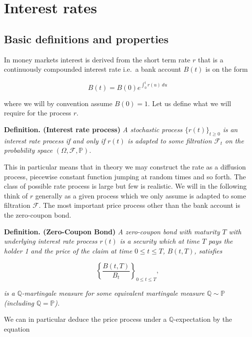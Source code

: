 \documentclass[a4paper,12pt,openany]{book}
\begin{document}
\hypertarget{interest-rates}{%
\section{Interest rates}\label{interest-rates}}

\hypertarget{basic-definitions-and-properties}{%
\subsection{Basic definitions and properties}\label{basic-definitions-and-properties}}

In money markets interest is derived from the short term rate \(r\) that is a continuously compounded interest rate i.e.~a bank account \(B(t)\) is on the form

\[
B(t)=B(0)e^{\int_0^tr(u)\ du}
\]

where we will by convention assume \(B(0)=1\). Let us define what we will require for the process \(r\).

\textbf{Definition. (Interest rate process)} \emph{A stochastic process \(\{r(t)\}_{t\ge 0}\) is an interest rate process if and only if \(r(t)\) is adapted to some filtration \(\mathcal F_t\) on the probability space \((\Omega,\mathcal F,\mathbb P)\).}

This in particular means that in theory we may construct the rate as a diffusion process, piecewise constant function jumping at random times and so forth. The class of possible rate process is large but few is realistic. We will in the following think of \(r\) generally as a given process which we only assume is adapted to some filtration \(\mathcal F\). The most important price process other than the bank account is the zero-coupon bond.

\textbf{Definition. (Zero-Coupon Bond)} \emph{A zero-coupon bond with maturity \(T\) with underlying interest rate process \(r(t)\) is a security which at time \(T\) pays the holder 1 and the price of the claim at time \(0\le t\le T\), \(B(t,T)\), satisfies}

\[
\left\{\frac{B(t,T)}{B_t}\right\}_{0\le t\le T},
\]

\emph{is a \(\mathbb Q\)-martingale measure for some equivalent martingale measure \(\mathbb Q\sim \mathbb P\) (including \(\mathbb Q = \mathbb P\)).}

We can in particular deduce the price process under a \(\mathbb Q\)-expectation by the equation
\end{document}
